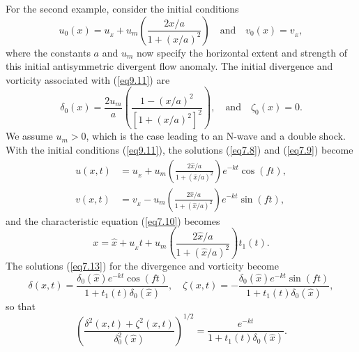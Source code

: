 \documentclass[10pt]{article}
\begin{document}
     For the second example, consider the initial conditions
\begin{equation}                                  %
       u_0(x) = u_{_E} + u_m \left(\frac{2x/a}{1 + (x/a)^2}\right)
       \quad \text{and} \quad    v_0(x) = v_{_E},
\label{eq9.11}
\end{equation}
where the constants $a$ and $u_m$ now specify the horizontal extent and
strength of this initial antisymmetric divergent flow anomaly.  The initial
divergence and vorticity associated with (\ref{eq9.11}) are
\begin{equation}                                  %
     \delta_0(x) = \frac{2u_m}{a} \left(\frac{1 - (x/a)^2}{[1 + (x/a)^2]^2}\right),
     \quad \text{and} \quad   \zeta_0(x)  = 0.
\label{eq9.12}
\end{equation}
We assume $u_m>0$, which is the case leading to an N-wave and a double shock. With
the initial conditions (\ref{eq9.11}), the solutions (\ref{eq7.8}) and (\ref{eq7.9})
become
\begin{equation}                                  %
  \begin{split}
       u(x,t) &= u_{_E} + u_m\left(\frac{2\hat{x}/a}{1 + (\hat{x}/a)^2}\right)e^{-kt}\cos(ft), \\
       v(x,t) &= v_{_E} - u_m\left(\frac{2\hat{x}/a}{1 + (\hat{x}/a)^2}\right)e^{-kt}\sin(ft),
  \end{split}
\label{eq9.13}
\end{equation}
and the characteristic equation (\ref{eq7.10}) becomes
\begin{equation}                                  %
       x = \hat{x} + u_{_E}t + u_m\left(\frac{2\hat{x}/a}{1 + (\hat{x}/a)^2}\right)t_1(t).
\label{eq9.14}
\end{equation}
The solutions (\ref{eq7.13}) for the divergence and vorticity become
\begin{equation}                                  %
      \delta(x,t) = \frac{\delta_0(\hat{x})e^{-kt}\cos(ft)}{1 + t_1(t)\delta_0(\hat{x})}, \quad
      \zeta (x,t) =-\frac{\delta_0(\hat{x})e^{-kt}\sin(ft)}{1 + t_1(t)\delta_0(\hat{x})},
\label{eq9.15}
\end{equation}
so that
\begin{equation}                                    %
        \left(\frac{\delta^2(x,t) + \zeta^2(x,t)}{\delta_0^2(\hat{x})}\right)^{1/2}
     = \frac{e^{-kt}}{1 + t_1(t)\delta_0(\hat{x})}.
\label{eq9.16}
\end{equation}
\end{document}
